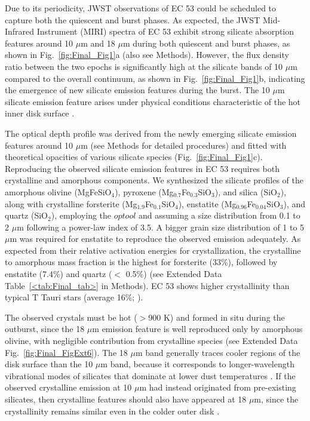 \documentclass[pdflatex,sn-mathphys-num]{sn-jnl}
\theoremstyle{thmstyleone}
\theoremstyle{thmstyletwo}
\theoremstyle{thmstylethree}
\begin{document}
\begin{bibunit}
Due to its periodicity, JWST observations of EC 53 could be scheduled to capture both the quiescent and burst phases. As expected, the JWST Mid-Infrared Instrument (MIRI) spectra of EC 53 exhibit strong silicate absorption features around 10 $\mu$m and 18 $\mu$m during both quiescent and burst phases, as shown in Fig.~\ref{fig:Final_Fig1}a (also see Methods). However, the flux density ratio between the two epochs is significantly high at the silicate bands of 10 $\mu$m compared to the overall continuum, as shown in Fig.~\ref{fig:Final_Fig1}b, indicating the emergence of new silicate emission features during the burst. The 10 $\mu$m silicate emission feature arises under physical conditions characteristic of the hot inner disk surface \citep{Jang2024Model}.

The optical depth profile was derived from the newly emerging silicate emission features around 10 $\mu$m (see Methods for detailed procedures) and fitted with theoretical opacities of various silicate species (Fig.~\ref{fig:Final_Fig1}c).
Reproducing the observed silicate emission features in EC 53 requires both crystalline and amorphous components. We synthesized the silicate profiles of the amorphous olivine (MgFeSiO$_4$), pyroxene (Mg$_{0.7}$Fe$_{0.3}$SiO$_3$), and silica (SiO$_{2}$), along with crystalline forsterite (Mg$_{1.9}$Fe$_{0.1}$SiO$_4$), enstatite (Mg$_{0.96}$Fe$_{0.04}$SiO$_3$), and quartz (SiO$_{2}$), employing the $optool$ \citep{Dominik2021} and assuming
a size distribution from 0.1 to 2 $\mu$m following a power-law index of 3.5. A bigger grain size distribution of 1 to 5 $\mu$m was required for enstatite to reproduce the observed emission adequately.
As expected from their relative activation energies for crystallization, the crystalline to amorphous mass fraction is the highest for forsterite (33\%), followed by enstatite (7.4\%) and quartz ($<$ 0.5\%) (see Extended Data Table~\ref{<tab:Final_tab>} in Methods). EC 53 shows higher crystallinity than typical T Tauri stars (average 16\%; \citep{Olofsson2010}).

The observed crystals must be hot ($>$900 K) and formed in situ during the outburst, since the 18 $\mu$m emission feature is well reproduced only by amorphous olivine, with negligible contribution from crystalline species (see Extended Data Fig.~\ref{fig:Final_FigExt6}). The 18 $\mu$m band generally traces cooler regions of the disk surface than the 10 $\mu$m band, because it corresponds to longer-wavelength vibrational modes of silicates that dominate at lower dust temperatures \citep[e.g.,][]{Abraham2009, Lu2022}. If the observed crystalline emission at 10 $\mu$m had instead originated from pre-existing silicates, then crystalline features should also have appeared at 18 $\mu$m, since the crystallinity remains similar even in the colder outer disk \citep{Olofsson2010}.


\end{bibunit}
\end{document}
